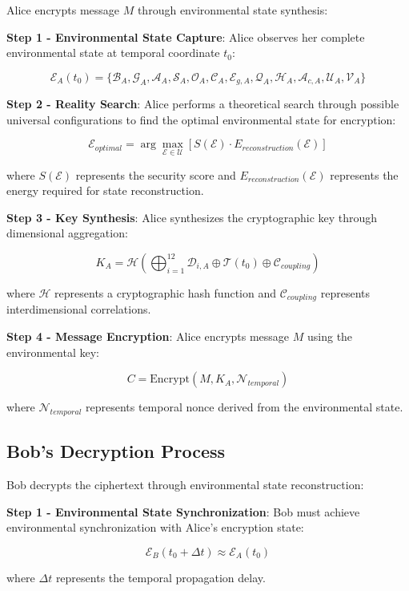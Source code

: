 \documentclass[12pt]{article}
\begin{document}
Alice encrypts message $M$ through environmental state synthesis:

\textbf{Step 1 - Environmental State Capture}: Alice observes her complete environmental state at temporal coordinate $t_0$:

$$\mathcal{E}_A(t_0) = \{\mathcal{B}_A, \mathcal{G}_A, \mathcal{A}_A, \mathcal{S}_A, \mathcal{O}_A, \mathcal{C}_A, \mathcal{E}_{g,A}, \mathcal{Q}_A, \mathcal{H}_A, \mathcal{A}_{c,A}, \mathcal{U}_A, \mathcal{V}_A\}$$

\textbf{Step 2 - Reality Search}: Alice performs a theoretical search through possible universal configurations to find the optimal environmental state for encryption:

$$\mathcal{E}_{optimal} = \arg\max_{\mathcal{E} \in \mathcal{U}} \left[ S(\mathcal{E}) \cdot E_{reconstruction}(\mathcal{E}) \right]$$

where $S(\mathcal{E})$ represents the security score and $E_{reconstruction}(\mathcal{E})$ represents the energy required for state reconstruction.

\textbf{Step 3 - Key Synthesis}: Alice synthesizes the cryptographic key through dimensional aggregation:

$$K_A = \mathcal{H}\left(\bigoplus_{i=1}^{12} \mathcal{D}_{i,A} \oplus \mathcal{T}(t_0) \oplus \mathcal{C}_{coupling}\right)$$

where $\mathcal{H}$ represents a cryptographic hash function and $\mathcal{C}_{coupling}$ represents interdimensional correlations.

\textbf{Step 4 - Message Encryption}: Alice encrypts message $M$ using the environmental key:

$$C = \text{Encrypt}(M, K_A, \mathcal{N}_{temporal})$$

where $\mathcal{N}_{temporal}$ represents temporal nonce derived from the environmental state.

\subsection{Bob's Decryption Process}

Bob decrypts the ciphertext through environmental state reconstruction:

\textbf{Step 1 - Environmental State Synchronization}: Bob must achieve environmental synchronization with Alice's encryption state:

$$\mathcal{E}_B(t_0 + \Delta t) \approx \mathcal{E}_A(t_0)$$

where $\Delta t$ represents the temporal propagation delay.
\end{document}

